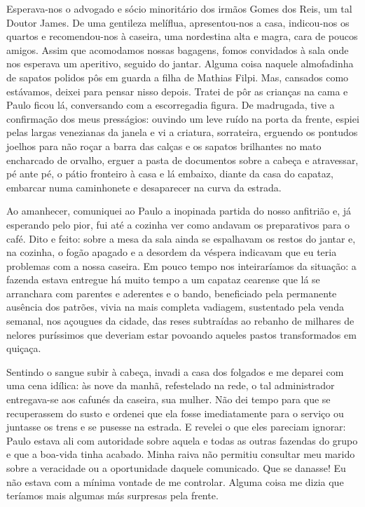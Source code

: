 Esperava-nos o advogado e sócio minoritário dos irmãos Gomes dos Reis, um tal Doutor James.
De uma gentileza melíflua, apresentou-nos a casa, indicou-nos os quartos e recomendou-nos à caseira, uma nordestina alta e magra, cara de poucos amigos.
Assim que acomodamos nossas bagagens, fomos convidados à sala onde nos esperava um aperitivo, seguido do jantar.
Alguma coisa naquele almofadinha de sapatos polidos pôs em guarda a filha de Mathias Filpi.
Mas, cansados como estávamos, deixei para pensar nisso depois.
Tratei de pôr as crianças na cama e Paulo ficou lá, conversando com a escorregadia figura.
De madrugada, tive a confirmação dos meus presságios: ouvindo um leve ruído na porta da frente, espiei pelas largas venezianas da janela e vi a criatura, sorrateira, erguendo os pontudos joelhos para não roçar a barra das calças e os sapatos brilhantes no mato encharcado de orvalho, erguer a pasta de documentos sobre a cabeça e atravessar, pé ante pé, o pátio fronteiro à casa e lá embaixo, diante da casa do capataz, embarcar numa caminhonete e desaparecer na curva da estrada.
 

Ao amanhecer, comuniquei ao Paulo a inopinada partida do nosso anfitrião e, já esperando pelo pior, fui até a cozinha ver como andavam os preparativos para o café.
Dito e feito: sobre a mesa da sala ainda se espalhavam os restos do jantar e, na cozinha, o fogão apagado e a desordem da véspera indicavam que eu teria problemas com a nossa caseira.
Em pouco tempo nos inteiraríamos da situação: a fazenda estava entregue há muito tempo a um capataz cearense que lá se arranchara com parentes e aderentes e o bando, beneficiado pela permanente ausência dos patrões, vivia na mais completa vadiagem, sustentado pela venda semanal, nos açougues da cidade, das reses subtraídas ao rebanho de milhares de nelores puríssimos que deveriam estar povoando aqueles pastos transformados em quiçaça.

Sentindo o sangue subir à cabeça, invadi a casa dos folgados e me deparei com uma cena idílica: às nove da manhã, refestelado na rede, o tal administrador entregava-se aos cafunés da caseira, sua mulher.
Não dei tempo para que se recuperassem do susto e ordenei que ela fosse imediatamente para o serviço ou juntasse os trens e se pusesse na estrada.
E revelei o que eles pareciam ignorar: Paulo estava ali com autoridade sobre aquela e todas as outras fazendas do grupo e que a boa-vida tinha acabado.
Minha raiva não permitiu consultar meu marido sobre a veracidade ou a oportunidade daquele comunicado.
Que se danasse! Eu não estava com a mínima vontade de me controlar.
Alguma coisa me dizia que teríamos mais algumas más surpresas pela frente.

